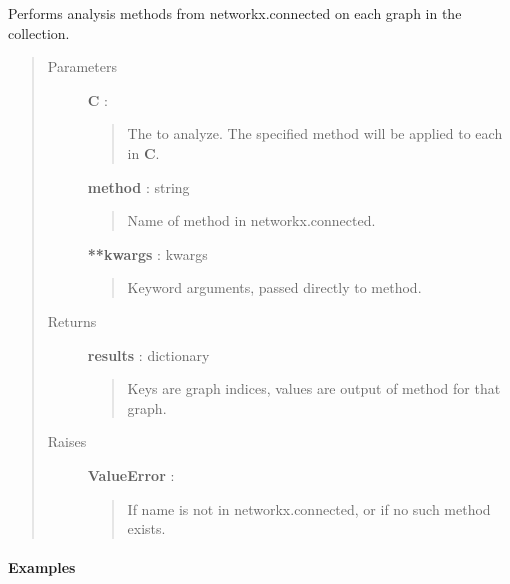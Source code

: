 \documentclass[letterpaper,10pt,english]{sphinxmanual}
\begin{document}

\begin{fulllineitems}
\label{tethne.analyze:tethne.analyze.collection.connected}
Performs analysis methods from networkx.connected on each graph in the
collection.
\begin{quote}\begin{description}
\item[{Parameters }] \leavevmode
\textbf{C} : {\hyperref[tethne:tethne.data.GraphCollection]{}}
\begin{quote}

The {\hyperref[tethne:tethne.data.GraphCollection]{}} to analyze. The specified method will be
applied to each  in \textbf{C}.
\end{quote}

\textbf{method} : string
\begin{quote}

Name of method in networkx.connected.
\end{quote}

\textbf{**kwargs} : kwargs
\begin{quote}

Keyword arguments, passed directly to method.
\end{quote}

\item[{Returns }] \leavevmode
\textbf{results} : dictionary
\begin{quote}

Keys are graph indices, values are output of method for that graph.
\end{quote}

\item[{Raises }] \leavevmode
\textbf{ValueError} :
\begin{quote}

If name is not in networkx.connected, or if no such method exists.
\end{quote}

\end{description}\end{quote}
\paragraph{Examples}


\end{fulllineitems}
\end{document}
